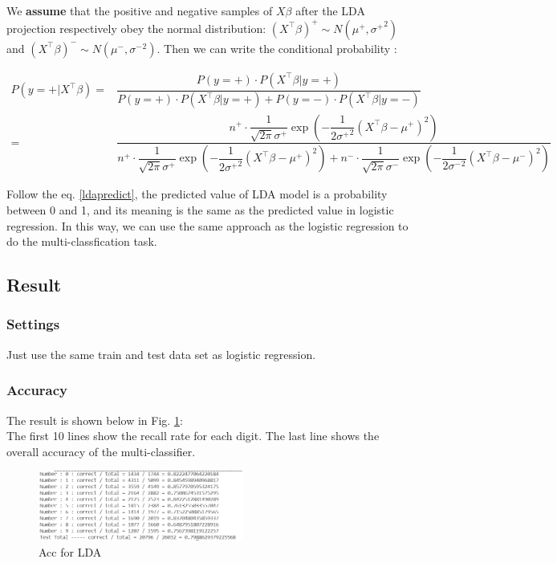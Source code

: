 \documentclass{article}
\begin{document}
We \textbf{assume} that the positive and negative samples of $X\beta$ after the LDA projection respectively obey the normal distribution: $(X^\top\beta)^+\sim N(\mu^+, {\sigma^+}^2)$ and $(X^\top\beta)^-\sim N(\mu^-, {\sigma^-}^2)$. Then we can write the conditional probability :
\begin{spacing}{2.0}
\begin{equation}
    \label{ldapredict}
\begin{array}{rl}
    P(y=+|X^\top\beta)=&\dfrac{P(y=+)\cdot P(X^\top\beta|y=+)}{P(y=+)\cdot P(X^\top\beta|y=+) + P(y=-)\cdot P(X^\top\beta|y=-)}\\
    =&\dfrac{n^+ \cdot \dfrac{1}{\sqrt{2\pi}\sigma^+}\exp\left(-\dfrac{1}{2{\sigma^{+}}^2}(X^\top\beta - \mu^+)^2\right)}{n^+ \cdot \dfrac{1}{\sqrt{2\pi}\sigma^+}\exp\left(-\dfrac{1}{2{\sigma^{+}}^2}(X^\top\beta - \mu^+)^2\right) + n^- \cdot \dfrac{1}{\sqrt{2\pi}\sigma^-}\exp\left(-\dfrac{1}{2{\sigma^{-}}^2}(X^\top\beta - \mu^-)^2\right)}
\end{array}
\end{equation}
\end{spacing}
Follow the eq. \ref{ldapredict}, the predicted value of LDA model is a probability between 0 and 1, and its meaning is the same as the predicted value in logistic regression. In this way, we can use the same approach as the logistic regression to do the multi-classfication task.
\subsection{Result}
\subsubsection{Settings}
Just use the same train and test data set as logistic regression.
\subsubsection{Accuracy}
The result is shown below in Fig. \ref{acclda}:\\
The first 10 lines show the recall rate for each digit. The last line shows the overall accuracy of the multi-classifier.
\begin{figure}[H]
    \centering
    \caption{Acc for LDA}
    \label{acclda}
    \includegraphics[width=0.6\textwidth]{fig/5-1.png}
\end{figure}
\end{document}
